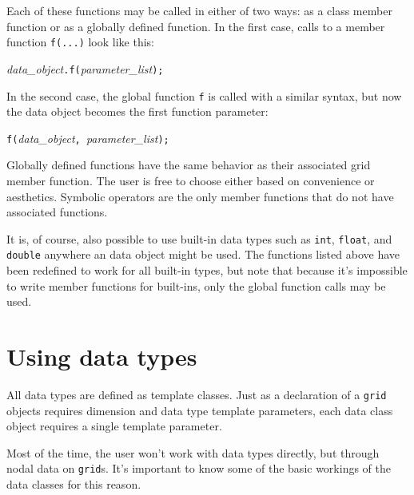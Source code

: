 Each of these functions may be called in either of two ways: as a class member function or as a globally defined function.  In the first case, calls to a member function {\tt f(...)} look like this:
\begin{center}
{\it data\_object}{\tt .f(}{\it parameter\_list}{\tt );}
\end{center}
In the second case, the global function {\tt f} is called with a similar syntax, but now the data object becomes the first function parameter:
\begin{center}
{\tt f(}{\it data\_object}{\tt, }{\it parameter\_list}{\tt );}
\end{center}
Globally defined functions have the same behavior as their associated grid member function.  The user is free to choose either based on convenience or aesthetics.  Symbolic operators are the only member functions that do not have associated functions.

It is, of course, also possible to use built-in data types such as {\tt int}, {\tt float}, and {\tt double} anywhere an \MMSP data object might be used.  The functions listed above have been redefined to work for all built-in types, but note that because it's impossible to write member functions for built-ins, only the global function calls may be used.

\section{Using \MMSP data types}
All \MMSP data types are defined as template classes.  Just as a declaration of a {\tt grid} objects requires dimension and data type template parameters, each \MMSP data class object requires a single template parameter.

Most of the time, the user won't work with \MMSP data types directly, but through nodal data on {\tt grid}s.  It's important to know some of the basic workings of the \MMSP data classes for this reason.

